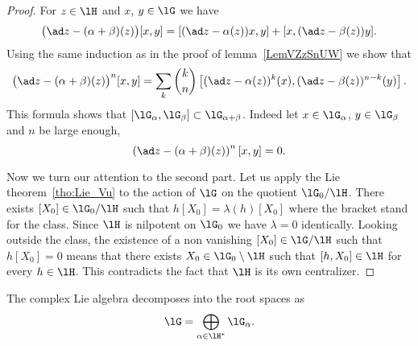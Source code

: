 \begin{proof}
For $z\in\lH$ and $x$, $y\in\lG$ we have
\begin{equation}
\big( \ad z-(\alpha+\beta)(z) \big)[x,y]=[ (\ad z-\alpha(z))x,y ]+[ x,(\ad z-\beta(z))y ].
\end{equation}
Using the same induction as in the proof of lemma~\ref{LemVZzSnUW} we show that
\begin{equation}
\big( \ad z-(\alpha+\beta)(z) \big)^n[x,y]=\sum_k \binom{k}{n}
\left[
(\ad z-\alpha(z))^k(x),(\ad z-\beta(z))^{n-k}(y)
\right].
\end{equation}
This formula shows that $[\lG_{\alpha},\lG_{\beta}]\subset\lG_{\alpha+\beta}$. Indeed let $x\in\lG_{\alpha}$, $y\in\lG_{\beta}$ and $n$ be large enough,
\begin{equation}
    \left( \ad z-(\alpha+\beta)(z) \right)^n[x,y]=0.
\end{equation}

    Now we turn our attention to the second part. Let us apply the Lie theorem~\ref{tho:Lie_Vu} to the action of \( \lG\) on the quotient \( \lG_0/\lH\). There exists \( [X_0]\in\lG_0/\lH\) such that \( h[X_0]=\lambda(h)[X_0]\) where the bracket stand for the class. Since \( \lH\) is nilpotent on \( \lG_0\) we have \( \lambda=0\) identically. Looking outside the class, the existence of a non vanishing \( [X_0]\in\lG/\lH\) such that \( h[X_0]=0\) means that there exists \( X_0\in\lG_0\setminus\lH\) such that \( [h,X_0]\in\lH\) for every \( h\in\lH\). This contradicts the fact that \( \lH\) is its own centralizer.
\end{proof}

\begin{proposition}
    The complex Lie algebra decomposes into the root spaces as
    \begin{equation}
        \lG=\bigoplus_{\alpha\in\lH^*}\lG_{\alpha}.
    \end{equation}
\end{proposition}

